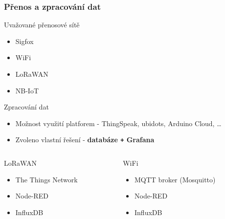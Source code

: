 \documentclass[%
  12pt,       				%
	t,                  %
	aspectratio=1610,   %
	unicode,						%
]{beamer}				    	%
\begin{document}
\begin{frame}
	\frametitle{Přenos a zpracování dat}
	Uvažované přenosové sítě
	\begin{itemize}
		\item Sigfox
		\item WiFi
		\item LoRaWAN
		\item NB-IoT
	\end{itemize}

	Zpracování dat
	\begin{itemize}
		\item Možnost využití platforem - ThingSpeak, ubidots, Arduino Cloud, \dots
		\item Zvoleno vlastní řešení - \textbf{databáze \texttt{+} Grafana}
	\end{itemize}

	\vspace{0.5ex}
	\begin{columns}
		\begin{column}{0.45\textwidth}
			LoRaWAN\\[0.5ex]
			\begin{itemize}
				\item The Things Network
				\item Node-RED
				\item InfluxDB
			\end{itemize}

		\end{column}

		\begin{column}{0.45\textwidth}
			WiFi\\[0.5ex]
			\begin{itemize}
				\item MQTT broker (Mosquitto)
				\item Node-RED
				\item InfluxDB
			\end{itemize}
		\end{column}
	\end{columns}
\end{frame}

\end{document}
